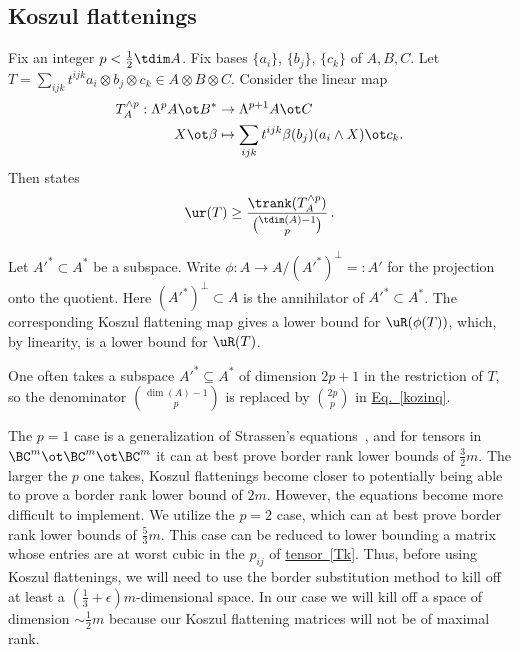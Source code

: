 \documentclass[11pt]{article}
\newcommand{\expeqref}[2]{\texorpdfstring{\hyperref[#2]{#1~\eqref{#2}}}{#1~\eqref{#2}}}
\begin{document}
\subsection{Koszul flattenings}\label{subsec: generalized flattenings}
Fix an integer $p<\frac 12 \tdim A$.
Fix bases $\{a_i\}$, $\{b_j\}$, $\{ c_k\}$ of   $A,B,C$. Let  
$T = \sum_{ijk} t^{ijk} a_i \otimes b_j \otimes c_k \in A \otimes B \otimes C$. Consider the linear map
\begin{align*}
T_A^{\wedge p}: \Lambda^p A \ot B^* &\to \Lambda^{p+1}A\ot C \\
X\ot \beta & \mapsto \sum_{ijk}t^{ijk}\beta(b_j)(a_i\wedge X) \ot c_k.
\end{align*}
Then  \cite[Proposition 4.1.1]{MR3081636} states 
\begin{equation}\label{kozinq}
\ur(T)\geq \frac{\trank(T_{A}^{\wedge p})}{\binom {\tdim(A)-1}p}\,.
\end{equation}

Let ${A'}^*\subset A^*$ be a subspace. Write $\phi : A \to A/ 
({A'}^*)^\perp=:A'$ for the projection onto the quotient.
Here $({A'}^*)^\perp\subset A$ is the annihilator of ${A'}^*\subset A^*$.
The corresponding Koszul 
flattening map gives a lower bound for $\uR(\phi(T))$, which, by linearity, is 
a lower bound for $\uR(T)$.

One often  takes a subspace ${A'}^*\subseteq A^*$ of dimension $2p+1$ in the restriction of
  $T$, so the denominator $\binom{\dim(A)-1}{p}$ is 
replaced by $\binom{2p}{p}$ in \expeqref{Eq.}{kozinq}.  

The $p=1$ case is a generalization of  Strassen's equations~\cite{Strassen505}, and
for tensors in 
$\BC^m\ot \BC^m\ot \BC^m$ it  can at best prove border rank lower bounds of $\frac 32m$.
 The larger the $p$ one takes, Koszul flattenings become  closer to potentially being
 able to prove a border rank lower bound
 of $2m$. However, the equations become more difficult to implement.
We  utilize the $p=2$ case, which 
can at best prove border rank lower bounds of $\frac 53m$. This case can be reduced
to lower bounding a matrix whose entries are at worst cubic in the $p_{ij}$ of
\expeqref{tensor}{Tk}.  %
Thus,  before using Koszul flattenings, 
 we will need to use the border substitution method to kill off  at least a 
$(\frac 13+\epsilon)m$-dimensional space.
In our case  we will  kill off  a space of dimension  
$\sim\frac{1}{2}m$ because our Koszul flattening matrices will not be of maximal rank.

\newcommand{\qz}{\hspace{-0.05em}}    %
%
    
\end{document}
